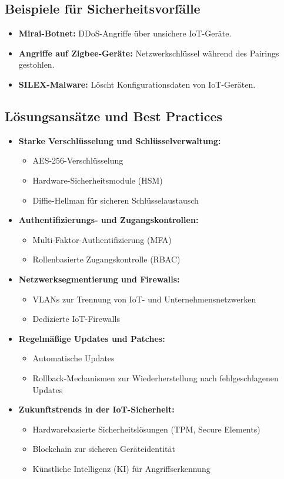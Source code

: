 \subsection{Beispiele für Sicherheitsvorfälle}
\begin{itemize}
    \item \textbf{Mirai-Botnet:} DDoS-Angriffe über unsichere IoT-Geräte.
    \item \textbf{Angriffe auf Zigbee-Geräte:} Netzwerkschlüssel während des Pairings gestohlen.
    \item \textbf{SILEX-Malware:} Löscht Konfigurationsdaten von IoT-Geräten.
\end{itemize}

\subsection{Lösungsansätze und Best Practices}
\begin{itemize}
    \item \textbf{Starke Verschlüsselung und Schlüsselverwaltung:}
    \begin{itemize}
        \item AES-256-Verschlüsselung
        \item Hardware-Sicherheitsmodule (HSM)
        \item Diffie-Hellman für sicheren Schlüsselaustausch
    \end{itemize}
    \item \textbf{Authentifizierungs- und Zugangskontrollen:}
    \begin{itemize}
        \item Multi-Faktor-Authentifizierung (MFA)
        \item Rollenbasierte Zugangskontrolle (RBAC)
    \end{itemize}
    \item \textbf{Netzwerksegmentierung und Firewalls:}
    \begin{itemize}
        \item VLANs zur Trennung von IoT- und Unternehmensnetzwerken
        \item Dedizierte IoT-Firewalls
    \end{itemize}
    \item \textbf{Regelmäßige Updates und Patches:}
    \begin{itemize}
        \item Automatische Updates
        \item Rollback-Mechanismen zur Wiederherstellung nach fehlgeschlagenen Updates
    \end{itemize}
    \item \textbf{Zukunftstrends in der IoT-Sicherheit:}
    \begin{itemize}
        \item Hardwarebasierte Sicherheitslösungen (TPM, Secure Elements)
        \item Blockchain zur sicheren Geräteidentität
        \item Künstliche Intelligenz (KI) für Angriffserkennung
    \end{itemize}
\end{itemize}

